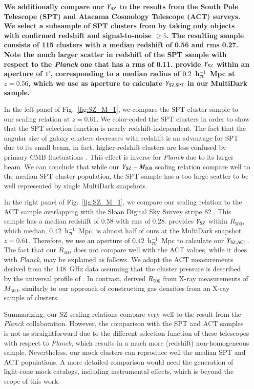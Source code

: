 \documentclass[useAMS,usenatbib]{mn2e}
\begin{document}
{\bf We additionally compare our $Y_{{\mathrm{SZ}}}$ to the results from the South Pole 
Telescope (SPT) and Atacama Cosmology Telescope (ACT) surveys.
We select a subsample of SPT clusters from \cite{2013ApJ...763..127R} by taking
only objects with confirmed redshift and signal-to-noise $\ge 5$. The resulting sample 
consists of 115 clusters with a median redshift of 0.56 and rms 0.27. Note the much larger 
scatter in redshift of the SPT sample with respect to the \emph{Planck} one that has 
a rms of 0.11. \cite{2013ApJ...763..127R} provide $Y_{{\mathrm{SZ}}}$ 
within an aperture of $1'$, corresponding to a median radius of $0.2$~h$_{70}^{-1}$~Mpc 
at $z = 0.56$, which we use as aperture to calculate $Y_{{\mathrm{SZ, SPT}}}$ in our MultiDark sample.

In the left panel of Fig.~\ref{fig:SZ_M_1}, we compare the SPT cluster sample to our 
scaling relation at $z = 0.61$. We color-coded the SPT clusters in order to show that the SPT 
selection function is nearly redshift-independent. The fact that the angular size of galaxy clusters 
decreases with redshift is an advantage for SPT due to its small beam, in fact, higher-redshift clusters 
are less confused by primary CMB fluctuations \citep{2013ApJ...763..127R}. This effect is inverse 
for \emph{Planck} due to its larger beam. We can conclude that while our $Y_{{\mathrm{SZ}}}-M_{500}$ 
scaling relation compare well to the median SPT cluster population, the SPT sample has a too
large scatter to be well represented by single MultiDark snapshots.

In the right panel of Fig.~\ref{fig:SZ_M_1}, we compare our scaling relation to
the ACT sample overlapping with the Sloan Digital Sky Survey stripe 82 
\citep{2013JCAP...07..008H}. This sample has a median redshift of 0.58 with rms 
of 0.28. \cite{2013JCAP...07..008H} provides $Y_{{\mathrm{SZ}}}$ within $R_{500}$, which
median, $0.42$~h$_{70}^{-1}$~Mpc, is almost half of ours at the
MultiDark snapshot $z=0.61$. Therefore, we use an aperture of $0.42$~h$_{70}^{-1}$~Mpc
to calculate our $Y_{{\mathrm{SZ, ACT}}}$. 
The fact that our $R_{500}$ does not compare well with the ACT values, while it does with 
\emph{Planck}, may be explained as follows. We adopt the ACT measurements derived from 
the 148~GHz data assuming that the cluster pressure is described by the universal 
profile of \cite{2010A&A...517A..92A}. In contrast, \cite{2013arXiv1303.5080P}
derived $R_{500}$ from X-ray measurements of $M_{500}$, similarly to
our approach of constructing gas densities from an X-ray sample of clusters. 

Summarizing, our SZ scaling relations compare very well to the result from
the \emph{Planck} collaboration. However, the comparison with the SPT and 
ACT samples is not as straightforward due to the different selection function 
of these telescopes with respect to \emph{Planck}, which results in a much
more (redshift) non-homogeneous sample. Nevertheless, our mock clusters 
can reproduce well the median SPT and ACT populations. A more detailed
comparison would need the generation of light-cone mock catalogs,
including instrumental effects, which is beyond the scope of this 
work.} 
\end{document}
